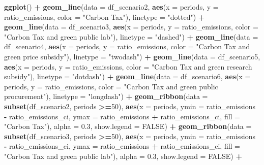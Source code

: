 \documentclass[
]{article}
\newenvironment{Shaded}{\begin{snugshade}}{\end{snugshade}}
\newcommand{\AttributeTok}[1]{\textcolor[rgb]{0.13,0.29,0.53}{#1}}
\newcommand{\ConstantTok}[1]{\textcolor[rgb]{0.56,0.35,0.01}{#1}}
\newcommand{\DecValTok}[1]{\textcolor[rgb]{0.00,0.00,0.81}{#1}}
\newcommand{\FloatTok}[1]{\textcolor[rgb]{0.00,0.00,0.81}{#1}}
\newcommand{\FunctionTok}[1]{\textcolor[rgb]{0.13,0.29,0.53}{\textbf{#1}}}
\newcommand{\NormalTok}[1]{#1}
\newcommand{\SpecialCharTok}[1]{\textcolor[rgb]{0.81,0.36,0.00}{\textbf{#1}}}
\newcommand{\StringTok}[1]{\textcolor[rgb]{0.31,0.60,0.02}{#1}}
\begin{document}
\begin{Shaded}
\begin{Highlighting}[]
\FunctionTok{ggplot}\NormalTok{() }\SpecialCharTok{+}
  \FunctionTok{geom\_line}\NormalTok{(}\AttributeTok{data =}\NormalTok{ df\_scenario2, }\FunctionTok{aes}\NormalTok{(}\AttributeTok{x =}\NormalTok{ periods, }\AttributeTok{y =}\NormalTok{ ratio\_emissions, }\AttributeTok{color =} \StringTok{"Carbon Tax"}\NormalTok{), }\AttributeTok{linetype =} \StringTok{"dotted"}\NormalTok{) }\SpecialCharTok{+}
  \FunctionTok{geom\_line}\NormalTok{(}\AttributeTok{data =}\NormalTok{ df\_scenario3, }\FunctionTok{aes}\NormalTok{(}\AttributeTok{x =}\NormalTok{ periods, }\AttributeTok{y =}\NormalTok{ ratio\_emissions, }\AttributeTok{color =} \StringTok{"Carbon Tax and green public lab"}\NormalTok{), }\AttributeTok{linetype =} \StringTok{"dashed"}\NormalTok{) }\SpecialCharTok{+}
  \FunctionTok{geom\_line}\NormalTok{(}\AttributeTok{data =}\NormalTok{ df\_scenario4, }\FunctionTok{aes}\NormalTok{(}\AttributeTok{x =}\NormalTok{ periods, }\AttributeTok{y =}\NormalTok{ ratio\_emissions, }\AttributeTok{color =} \StringTok{"Carbon Tax and green price subsidy"}\NormalTok{), }\AttributeTok{linetype =} \StringTok{"twodash"}\NormalTok{) }\SpecialCharTok{+}
  \FunctionTok{geom\_line}\NormalTok{(}\AttributeTok{data =}\NormalTok{ df\_scenario5, }\FunctionTok{aes}\NormalTok{(}\AttributeTok{x =}\NormalTok{ periods, }\AttributeTok{y =}\NormalTok{ ratio\_emissions, }\AttributeTok{color =} \StringTok{"Carbon Tax and green research subsidy"}\NormalTok{), }\AttributeTok{linetype =} \StringTok{"dotdash"}\NormalTok{) }\SpecialCharTok{+}
  \FunctionTok{geom\_line}\NormalTok{(}\AttributeTok{data =}\NormalTok{ df\_scenario6, }\FunctionTok{aes}\NormalTok{(}\AttributeTok{x =}\NormalTok{ periods, }\AttributeTok{y =}\NormalTok{ ratio\_emissions, }\AttributeTok{color =} \StringTok{"Carbon Tax and green public procurement"}\NormalTok{), }\AttributeTok{linetype =} \StringTok{"longdash"}\NormalTok{) }\SpecialCharTok{+}
  \FunctionTok{geom\_ribbon}\NormalTok{(}\AttributeTok{data =} \FunctionTok{subset}\NormalTok{(df\_scenario2, periods }\SpecialCharTok{\textgreater{}=}\DecValTok{50}\NormalTok{), }\FunctionTok{aes}\NormalTok{(}\AttributeTok{x =}\NormalTok{ periods, }\AttributeTok{ymin =}\NormalTok{ ratio\_emissions }\SpecialCharTok{{-}}\NormalTok{ ratio\_emissions\_ci, }\AttributeTok{ymax =}\NormalTok{ ratio\_emissions }\SpecialCharTok{+}\NormalTok{ ratio\_emissions\_ci, }\AttributeTok{fill =} \StringTok{"Carbon Tax"}\NormalTok{), }\AttributeTok{alpha =} \FloatTok{0.3}\NormalTok{, }\AttributeTok{show.legend =} \ConstantTok{FALSE}\NormalTok{) }\SpecialCharTok{+}
  \FunctionTok{geom\_ribbon}\NormalTok{(}\AttributeTok{data =} \FunctionTok{subset}\NormalTok{(df\_scenario3, periods }\SpecialCharTok{\textgreater{}=}\DecValTok{50}\NormalTok{), }\FunctionTok{aes}\NormalTok{(}\AttributeTok{x =}\NormalTok{ periods, }\AttributeTok{ymin =}\NormalTok{ ratio\_emissions }\SpecialCharTok{{-}}\NormalTok{ ratio\_emissions\_ci, }\AttributeTok{ymax =}\NormalTok{ ratio\_emissions }\SpecialCharTok{+}\NormalTok{ ratio\_emissions\_ci, }\AttributeTok{fill =} \StringTok{"Carbon Tax and green public lab"}\NormalTok{), }\AttributeTok{alpha =} \FloatTok{0.3}\NormalTok{, }\AttributeTok{show.legend =} \ConstantTok{FALSE}\NormalTok{) }\SpecialCharTok{+}

\end{Highlighting}
\end{Shaded}
\end{document}
